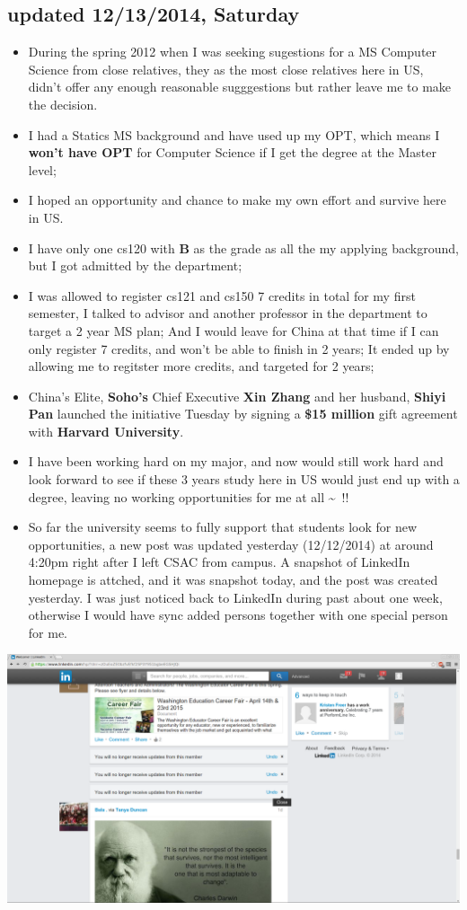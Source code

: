 \documentclass[9pt,b5paper]{article}
\begin{document}
\subsection{updated 12/13/2014, Saturday}
\label{sec-9-1}
\begin{itemize}
\item During the spring 2012 when I was seeking sugestions for a MS Computer Science from close relatives, they as the most close relatives here in US, didn't offer any enough reasonable sugggestions but rather leave me to make the decision.
\item I had a Statics MS background and have used up my OPT, which means I \textbf{won't have OPT} for Computer Science if I get the degree at the Master level;
\item I hoped an opportunity and chance to make my own effort and survive here in US.
\item I have only one cs120 with \textbf{B} as the grade as all the my applying background, but I got admitted by the department;
\item I was allowed to register cs121 and cs150 7 credits in total for my first semester, I talked to advisor and another professor in the department to target a 2 year MS plan; And I would leave for China at that time if I can only register 7 credits, and won't be able to finish in 2 years; It ended up by allowing me to regitster more credits, and targeted for 2 years;
\item China's Elite, \textbf{Soho's} Chief Executive \textbf{Xin Zhang} and her husband, \textbf{Shiyi Pan} launched the initiative Tuesday by signing a \textbf{\$15 million} gift agreement with \textbf{Harvard University}.
\item I have been working hard on my major, and now would still work hard and look forward to see if these 3 years study here in US would just end up with a degree, leaving no working opportunities for me at all \textasciitilde{}~!!
\item So far the university seems to fully support that students look for new opportunities, a new post was updated yesterday (12/12/2014) at around 4:20pm right after I left CSAC from campus. A snapshot of LinkedIn homepage is attched, and it was snapshot today, and the post was created yesterday. I was just noticed back to LinkedIn during past about one week, otherwise I would have sync added persons together with one special person for me.
\end{itemize}
\includegraphics[width=.9\linewidth]{./Screenshot_from_2014-12-13_23:08:55.png}
\end{document}
